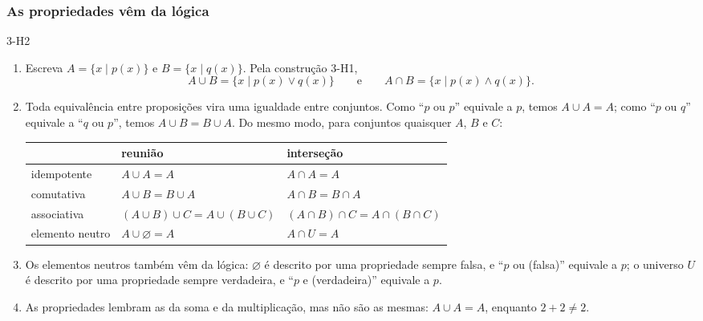 \subsubsection{As propriedades vêm da lógica}
\begin{construcao}{3-H2}
\begin{enumerate}[label=(\arabic*)]
  \item Escreva $A=\{x\mid p(x)\}$ e $B=\{x\mid q(x)\}$. Pela construção 3-H1,
\[
A\cup B=\{x\mid p(x)\vee q(x)\}\qquad\text{e}\qquad A\cap B=\{x\mid p(x)\wedge q(x)\}.
\]
  \item Toda equivalência entre proposições vira uma igualdade entre conjuntos. Como \enquote{$p$ ou $p$} equivale a $p$, temos $A\cup A=A$; como \enquote{$p$ ou $q$} equivale a \enquote{$q$ ou $p$}, temos $A\cup B=B\cup A$. Do mesmo modo, para conjuntos quaisquer $A$, $B$ e $C$:
\begin{center}
\begin{tabular}{@{}lll@{}}
 & reunião & interseção\\\midrule
idempotente & $A\cup A=A$ & $A\cap A=A$\\
comutativa & $A\cup B=B\cup A$ & $A\cap B=B\cap A$\\
associativa & $(A\cup B)\cup C=A\cup(B\cup C)$ & $(A\cap B)\cap C=A\cap(B\cap C)$\\
elemento neutro & $A\cup\varnothing=A$ & $A\cap U=A$\\
\end{tabular}
\end{center}
  \item Os elementos neutros também vêm da lógica: $\varnothing$ é descrito por uma propriedade sempre falsa, e \enquote{$p$ ou (falsa)} equivale a $p$; o universo $U$ é descrito por uma propriedade sempre verdadeira, e \enquote{$p$ e (verdadeira)} equivale a $p$.
  \item As propriedades lembram as da soma e da multiplicação, mas não são as mesmas: $A\cup A=A$, enquanto $2+2\neq2$.
\end{enumerate}
\end{construcao}

